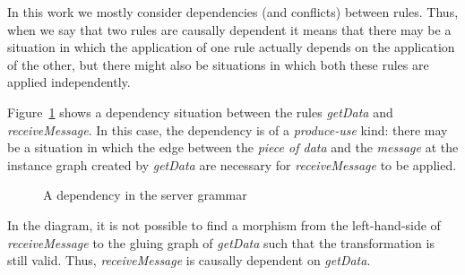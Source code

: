 In this work we mostly consider dependencies (and conflicts) between rules. Thus, when we say that two rules are causally dependent it means that there may be a situation in which the application of one rule actually depends on the application of the other, but there might also be situations in which both these rules are applied independently.

\begin{example}
  Figure~\ref{fig:gts:dependency} shows a dependency situation between the rules \emph{getData} and \emph{receiveMessage}. In this case, the dependency is of a \emph{produce-use} kind: there may be a situation in which the edge between the \emph{piece of data} and the \emph{message} at the instance graph created by \emph{getData} are necessary for \emph{receiveMessage} to be applied.

\begin{figure}[!ht]
  \centering
  \caption{A dependency in the server grammar}\label{fig:gts:dependency}
\end{figure}

  In the diagram, it is not possible to find a morphism from the left-hand-side of \emph{receiveMessage} to the gluing graph of \emph{getData} such that the transformation is still valid. Thus, \emph{receiveMessage} is causally dependent on \emph{getData}.
\end{example}

